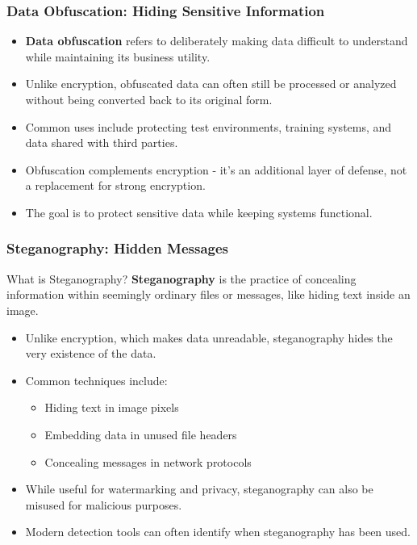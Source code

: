\documentclass{beamer}
\begin{document}
\begin{frame}
    \frametitle{Data Obfuscation: Hiding Sensitive Information}
    
    \begin{itemize}
        \item \textbf{Data obfuscation} refers to deliberately making data difficult to understand while maintaining its business utility.
        
        \item Unlike encryption, obfuscated data can often still be processed or analyzed without being converted back to its original form.
        
        \item Common uses include protecting test environments, training systems, and data shared with third parties.
        
        \item Obfuscation complements encryption - it's an additional layer of defense, not a replacement for strong encryption.
        
        \item The goal is to protect sensitive data while keeping systems functional.
    \end{itemize}
\end{frame}

\begin{frame}
    \frametitle{Steganography: Hidden Messages}
    
    \begin{block}{What is Steganography?}
        \textbf{Steganography} is the practice of concealing information within seemingly ordinary files or messages, like hiding text inside an image.
    \end{block}
    
    \begin{itemize}
        \item Unlike encryption, which makes data unreadable, steganography hides the very existence of the data.
        
        \item Common techniques include:
            \begin{itemize}
                \item Hiding text in image pixels
                \item Embedding data in unused file headers
                \item Concealing messages in network protocols
            \end{itemize}
        
        \item While useful for watermarking and privacy, steganography can also be misused for malicious purposes.
        
        \item Modern detection tools can often identify when steganography has been used.
    \end{itemize}
\end{frame}
\end{document}
